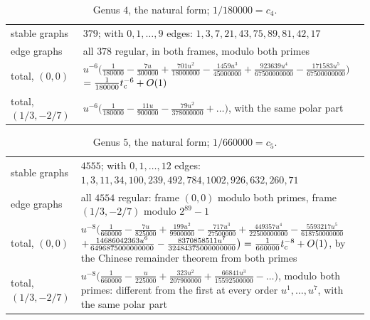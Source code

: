 \begin{table}[ht]
\centering\small
\begin{tabular}{l|p{}}
stable graphs & $379$; with $0,1,\dots,9$ edges: $1,3,7,21,43,75,89,81,42,17$\\
edge graphs & all $378$ regular, in both frames, modulo both primes\\
total, $(0,0)$ & $u^{-6}\bigl(\tfrac{1}{180000}-\tfrac{7u}{300000}+\tfrac{701u^2}{18000000}-\tfrac{1459u^3}{45000000}+\tfrac{923639u^4}{67500000000}-\tfrac{171583u^5}{67500000000}\bigr)$ $=\tfrac{1}{180000}t_{\mathrm{c}}^{-6}+O(1)$\\
total, $(1/3,-2/7)$ & $u^{-6}\bigl(\tfrac{1}{180000}-\tfrac{11u}{900000}-\tfrac{79u^2}{378000000}+\dots\bigr)$, with the same polar part\\
\end{tabular}
\caption{Genus $4$, the natural form; $1/180000=c_4$.}
\label{tab:evi-g4}
\end{table}

\begin{table}[ht]
\centering\small
\begin{tabular}{l|p{}}
stable graphs & $4555$; with $0,1,\dots,12$ edges: $1,3,11,34,100,239,492,784,1002,926,632,260,71$\\
edge graphs & all $4554$ regular: frame $(0,0)$ modulo both primes, frame $(1/3,-2/7)$ modulo $2^{89}-1$\\
total, $(0,0)$ & $u^{-8}\bigl(\tfrac{1}{660000}-\tfrac{7u}{825000}+\tfrac{199u^2}{9900000}-\tfrac{717u^3}{27500000}+\tfrac{449357u^4}{22500000000}-\tfrac{5593217u^5}{618750000000}$ $+\tfrac{14686042363u^6}{6496875000000000}-\tfrac{8370858511u^7}{32484375000000000}\bigr)=\tfrac{1}{660000}t_{\mathrm{c}}^{-8}+O(1)$, by the Chinese remainder theorem from both primes\\
total, $(1/3,-2/7)$ & $u^{-8}\bigl(\tfrac{1}{660000}-\tfrac{u}{225000}+\tfrac{323u^2}{207900000}+\tfrac{66841u^3}{15592500000}-\dots\bigr)$, modulo both primes: different from the first at every order $u^1,\dots,u^7$, with the same polar part\\
\end{tabular}
\caption{Genus $5$, the natural form; $1/660000=c_5$.}
\label{tab:evi-g5}
\end{table}


